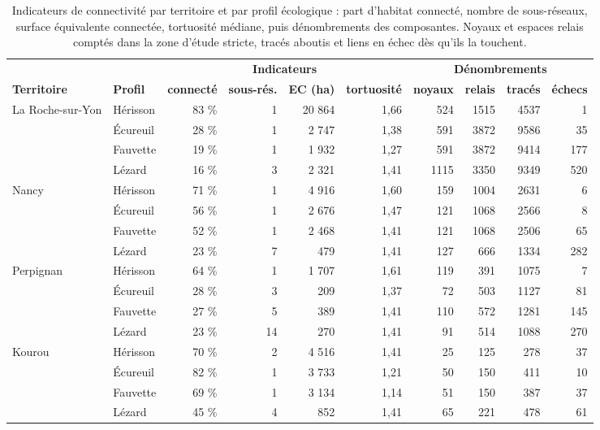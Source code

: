 \documentclass[a4paper,12pt]{report}
\renewcommand{\arraystretch}{1.2}
\begin{document}
\begin{table}[H]
\centering
\scriptsize
\setlength{\tabcolsep}{3pt}
\renewcommand{\arraystretch}{1.05}
\caption{Indicateurs de connectivité par territoire et par profil écologique : part d'habitat connecté, nombre de sous-réseaux, surface équivalente connectée, tortuosité médiane, puis dénombrements des composantes. Noyaux et espaces relais comptés dans la zone d'étude stricte, tracés aboutis et liens en échec dès qu'ils la touchent.}
\begin{tabular}{@{}llrrrrrrrr@{}}
\toprule
 & & \multicolumn{4}{c}{\textbf{Indicateurs}} & \multicolumn{4}{c}{\textbf{Dénombrements}} \\
\cmidrule(lr){3-6} \cmidrule(lr){7-10}
\textbf{Territoire} & \textbf{Profil} & \textbf{connecté} & \textbf{sous-rés.} & \textbf{EC (ha)} & \textbf{tortuosité} & \textbf{noyaux} & \textbf{relais} & \textbf{tracés} & \textbf{échecs} \\
\midrule
La Roche-sur-Yon & Hérisson & 83 \% & 1 & 20 864 & 1,66 & 524 & 1515 & 4537 & 1 \\
 & Écureuil & 28 \% & 1 & 2 747 & 1,38 & 591 & 3872 & 9586 & 35 \\
 & Fauvette & 19 \% & 1 & 1 932 & 1,27 & 591 & 3872 & 9414 & 177 \\
 & Lézard & 16 \% & 3 & 2 321 & 1,41 & 1115 & 3350 & 9349 & 520 \\
Nancy & Hérisson & 71 \% & 1 & 4 916 & 1,60 & 159 & 1004 & 2631 & 6 \\
 & Écureuil & 56 \% & 1 & 2 676 & 1,47 & 121 & 1068 & 2566 & 8 \\
 & Fauvette & 52 \% & 1 & 2 468 & 1,41 & 121 & 1068 & 2506 & 65 \\
 & Lézard & 23 \% & 7 & 479 & 1,41 & 127 & 666 & 1334 & 282 \\
Perpignan & Hérisson & 64 \% & 1 & 1 707 & 1,61 & 119 & 391 & 1075 & 7 \\
 & Écureuil & 28 \% & 3 & 209 & 1,37 & 72 & 503 & 1127 & 81 \\
 & Fauvette & 27 \% & 5 & 389 & 1,41 & 110 & 572 & 1281 & 145 \\
 & Lézard & 23 \% & 14 & 270 & 1,41 & 91 & 514 & 1088 & 270 \\
Kourou & Hérisson & 70 \% & 2 & 4 516 & 1,41 & 25 & 125 & 278 & 37 \\
 & Écureuil & 82 \% & 1 & 3 733 & 1,21 & 50 & 150 & 411 & 10 \\
 & Fauvette & 69 \% & 1 & 3 134 & 1,14 & 51 & 150 & 387 & 37 \\
 & Lézard & 45 \% & 4 & 852 & 1,41 & 65 & 221 & 478 & 61 \\

\end{tabular}
\end{table}
\end{document}
